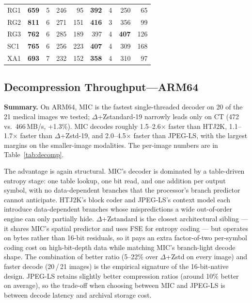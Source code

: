 \documentclass[journal]{IEEEtran}
\begin{document}
\begin{table}[htbp]
\begin{tabular}{l|rrrr|rrrr}
RG1  & \textbf{659}   &  5 & 246 &  95 & \textbf{392} &  4 & 250          &  65 \\
RG2  & \textbf{811}   &  6 & 271 & 151 & \textbf{416} &  3 & 356          &  99 \\
RG3  & \textbf{762}   &  6 & 285 & 189 & 397          &  4 & \textbf{407} & 126 \\
SC1  & \textbf{765}   &  6 & 256 & 223 & \textbf{407} &  4 & 309          & 168 \\
XA1  & \textbf{693}   &  7 & 232 & 152 & \textbf{358} &  4 & 310          &  97 \\
\bottomrule
\end{tabular}
\end{table}

\subsection{Decompression Throughput---ARM64}

\textbf{Summary.} On ARM64, MIC is the fastest single-threaded decoder
on 20 of the 21 medical images we tested; $\Delta$+Zstandard-19 narrowly
leads only on CT (472 vs.\ 466\,MB/s, +1.3\%). MIC decodes roughly
1.5--2.6$\times$ faster than HTJ2K, 1.1--1.7$\times$ faster than
$\Delta$+Zstd-19, and 2.0--4.5$\times$ faster than JPEG-LS, with the
largest margins on the smaller-image modalities. The per-image numbers
are in Table~\ref{tab:decomp}.

The advantage is again structural. MIC's decoder is dominated by a
table-driven entropy stage: one table lookup, one bit read, and one
addition per output symbol, with no data-dependent branches that the
processor's branch predictor cannot anticipate. HTJ2K's block coder and
JPEG-LS's context model each introduce data-dependent branches whose
mispredictions a wide out-of-order engine can only partially hide. $\Delta$+Zstandard is the closest architectural sibling --- it
shares MIC's spatial predictor and uses FSE for entropy coding --- but
operates on bytes rather than 16-bit residuals, so it pays an extra
factor-of-two per-symbol coding cost on high-bit-depth data while
matching MIC's branch-light decode shape. The combination of better
ratio (5--22\% over $\Delta$+Zstd on every image) and faster decode
(20\,/\,21 images) is the empirical signature of the 16-bit-native
design. JPEG-LS retains slightly better compression ratios (around 10\%
better on average), so the trade-off when choosing between MIC and
JPEG-LS is between decode latency and archival storage cost.
\end{document}
